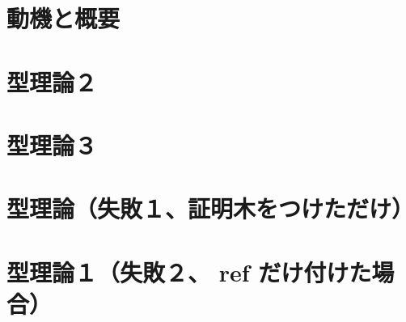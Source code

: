 \documentclass[dvipdfmx]{jsarticle}
\begin{document}
\section{動機と概要}


\newpage

\section{型理論２}

\newpage

\newpage


\section{型理論３}


\section{型理論（失敗１、証明木をつけただけ）}

\newpage

\section{型理論１（失敗２、 ref だけ付けた場合）}

\end{document}
